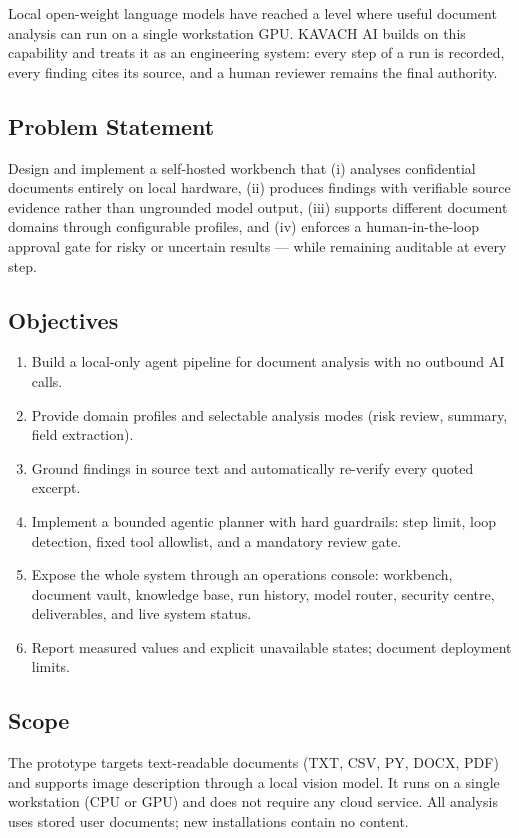 \documentclass[11pt,a4paper]{article}
\newcommand{\projectname}{KAVACH AI}
\begin{document}
Local open-weight language models have reached a level where useful document
analysis can run on a single workstation GPU. \projectname{} builds on this
capability and treats it as an engineering system: every step of a run is
recorded, every finding cites its source, and a human reviewer remains the
final authority.

\subsection{Problem Statement}
Design and implement a self-hosted workbench that (i) analyses confidential
documents entirely on local hardware, (ii) produces findings with verifiable
source evidence rather than ungrounded model output, (iii) supports different
document domains through configurable profiles, and (iv) enforces a
human-in-the-loop approval gate for risky or uncertain results --- while
remaining auditable at every step.

\subsection{Objectives}
\begin{enumerate}[leftmargin=1.4em]
  \item Build a local-only agent pipeline for document analysis with no
        outbound AI calls.
  \item Provide domain profiles and selectable analysis modes (risk review,
        summary, field extraction).
  \item Ground findings in source text and automatically re-verify every
        quoted excerpt.
  \item Implement a bounded agentic planner with hard guardrails: step limit,
        loop detection, fixed tool allowlist, and a mandatory review gate.
  \item Expose the whole system through an operations console: workbench,
        document vault, knowledge base, run history, model router, security
        centre, deliverables, and live system status.
  \item Report measured values and explicit unavailable states; document deployment limits.
\end{enumerate}

\subsection{Scope}
The prototype targets text-readable documents (TXT, CSV, PY, DOCX, PDF) and
supports image description through a local vision model. It runs on a single
workstation (CPU or GPU) and does not require any cloud service. All analysis uses stored user documents; new installations contain no content.
\end{document}
